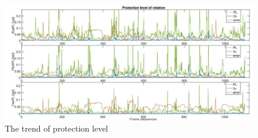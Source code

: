 \documentclass[10pt, letterpaper]{article}
\begin{document}
\author{
zain bin sumait}
\nocite{*}

\begin{figure}[thpb]
    \centering
    \includegraphics[width=\textwidth]{images/frame_se1.png}
    \caption{The trend of protection level}
    \label{fig:Frame_sequence}
\end{figure}
\end{document}
